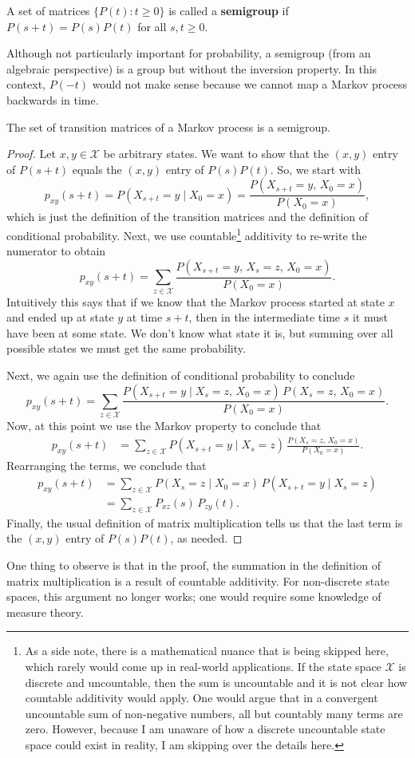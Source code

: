 \documentclass{ximera}
\begin{document}
\begin{definition}
A set of matrices $\{P(t) : t \geq 0\}$ is called a \textbf{semigroup} if $P(s + t) = P(s)P(t)$ for all
$s, t \geq 0$.
\end{definition}

Although not particularly important for probability, a semigroup (from an algebraic perspective) is a
group but without the inversion property. In this context, $P(-t)$ would not make sense because we cannot
map a Markov process backwards in time.

\begin{theorem}
The set of transition matrices of a Markov process is a semigroup.
\end{theorem}

\begin{proof}
Let $x, y \in \mathcal{X}$ be arbitrary states. We want to show that the $(x, y)$ entry of $P(s + t)$
equals the $(x, y)$ entry of $P(s)P(t)$. So, we start with
\[
p_{xy}(s + t) = P(X_{s+t} = y \mid X_0 = x)
= \frac{P(X_{s+t} = y,\, X_0 = x)}{P(X_0 = x)},
\]
which is just the definition of the transition matrices and the definition of conditional probability.
Next, we use countable\footnote{As a side note, there is a mathematical nuance that is being skipped
here, which rarely would come up in real-world applications. If the state space $\mathcal{X}$ is discrete
and uncountable, then the sum is uncountable and it is not clear how countable additivity would apply.
One would argue that in a convergent uncountable sum of non-negative numbers, all but countably many
terms are zero. However, because I am unaware of how a discrete uncountable state space could exist in
reality, I am skipping over the details here.} additivity to re-write the numerator to obtain
\[
p_{xy}(s + t) = \sum_{z \in \mathcal{X}}
\frac{P(X_{s+t} = y,\, X_s = z,\, X_0 = x)}{P(X_0 = x)}.
\]
Intuitively this says that if we know that the Markov process started at state $x$ and ended up at state
$y$ at time $s + t$, then in the intermediate time $s$ it must have been at some state. We don't know
what state it is, but summing over all possible states we must get the same probability.

Next, we again use the definition of conditional probability to conclude
\[
p_{xy}(s + t) = \sum_{z \in \mathcal{X}}
\frac{P(X_{s+t} = y \mid X_s = z,\, X_0 = x)\, P(X_s = z,\, X_0 = x)}{P(X_0 = x)}.
\]
Now, at this point we use the Markov property to conclude that
\begin{align*}
p_{xy}(s + t)
&= \sum_{z \in \mathcal{X}}
   P(X_{s+t} = y \mid X_s = z)\,
   \frac{P(X_s = z,\, X_0 = x)}{P(X_0 = x)}.
\end{align*}
Rearranging the terms, we conclude that
\begin{align*}
p_{xy}(s + t)
&= \sum_{z \in \mathcal{X}} P(X_s = z \mid X_0 = x)\, P(X_{s+t} = y \mid X_s = z) \\
&= \sum_{z \in \mathcal{X}} P_{xz}(s)\, P_{zy}(t).
\end{align*}
Finally, the usual definition of matrix multiplication tells us that the last term is the $(x, y)$ entry of
$P(s)P(t)$, as needed.
\end{proof}

One thing to observe is that in the proof, the summation in the definition of matrix multiplication is a
result of countable additivity. For non-discrete state spaces, this argument no longer works; one would
require some knowledge of measure theory.
\end{document}
